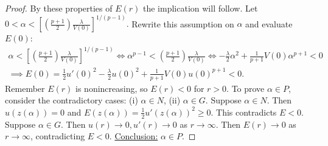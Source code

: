 \begin{lemma}
\begin{proof}
By these properties of $E(r)$ the implication will follow.
Let $0<\alpha<\left[\left(\frac{p+1}{2}\right)\frac{\lambda}{V(0)} \right]^{1/(p-1)}.$
Rewrite this assumption on $\alpha$ and evaluate $E(0)$:
\begin{gather*}
  \alpha<\left[\left(\frac{p+1}{2}\right)\frac{\lambda}{V(0)} \right]^{1/(p-1)}
  \iff\alpha^{p-1}<\left(\frac{p+1}{2}\right)\frac{\lambda}{V(0)}\iff
  -\frac{\lambda}{2}\alpha^2+\frac{1}{p+1}V(0)\alpha^{p+1}<0\\
  \implies E(0)=\frac{1}{2}u'(0)^2-\frac{\lambda}{2}u(0)^2+\frac{1}{p+1}V(0)u(0)^{p+1}<0.
\end{gather*}
Remember $E(r)$ is nonincreasing, so $E(r)<0$ for $r>0$.
\seperate
To prove $\alpha\in P$, consider the contradictory cases:
(i) $\alpha\in N$, (ii) $\alpha\in G$.
Suppose $\alpha\in N$.
Then $u(z(\alpha))=0$ and $E(z(\alpha))=\frac{1}{2}u'(z(\alpha))^2\geq0$.
This contradicts $E<0$.
Suppose $\alpha\in G$.
Then $u(r)\to0,u'(r)\to0$ as $r\to\infty$.
Then $E(r)\to0$ as $r\to\infty$, contradicting $E<0$.
\underline{Conclusion:} $\alpha\in P$.

\end{proof}
\end{lemma}

